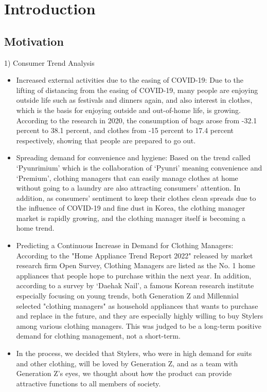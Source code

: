 \documentclass[conference]{IEEEtran}
\begin{document}
\section{Introduction}
\subsection{Motivation}
1) Consumer Trend Analysis
\begin{itemize}
    \item Increased external activities due to the easing of COVID-19: Due to the lifting of distancing from the easing of COVID-19, many people are enjoying outside life such as festivals and dinners again, and also interest in clothes, which is the basis for enjoying outside and out-of-home life, is growing. According to the research in 2020, the consumption of bags arose from -32.1 percent to 38.1 percent, and clothes from -15 percent to 17.4 percent respectively, showing that people are prepared to go out.\\
    \item Spreading demand for convenience and hygiene: Based on the trend called ‘Pyunrimium’ which is the collaboration of ‘Pyunri’ meaning convenience and ‘Premium’, clothing managers that can easily manage clothes at home without going to a laundry are also attracting consumers' attention. In addition, as consumers' sentiment to keep their clothes clean spreads due to the influence of COVID-19 and fine dust in Korea, the clothing manager market is rapidly growing, and the clothing manager itself is becoming a home trend.\\
    \item Predicting a Continuous Increase in Demand for Clothing Managers: According to the "Home Appliance Trend Report 2022" released by market research firm Open Survey, Clothing Managers are listed as the No. 1 home appliances that people hope to purchase within the next year. In addition, according to a survey by ‘Daehak Nail’, a famous Korean research institute especially focusing on young trends, both Generation Z and Millennial selected "clothing managers" as household appliances that wants to purchase and replace in the future, and they are especially highly willing to buy Stylers among various clothing managers. This was judged to be a long-term positive demand for clothing management, not a short-term.\\
    \item In the process, we decided that Stylers, who were in high demand for suits and other clothing, will be loved by Generation Z, and as a team with Generation Z's eyes, we thought about how the product can provide attractive functions to all members of society.\\
\end{itemize}
\end{document}
